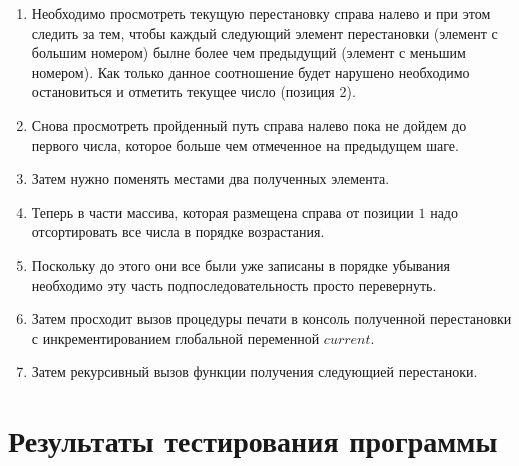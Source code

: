 \documentclass[bachelor, och, labwork]{shiza}
\begin{document}
\begin{enumerate}
    
\item Необходимо просмотреть текущую перестановку справа налево и при этом 
следить за тем, чтобы каждый следующий элемент перестановки (элемент с большим 
номером) былне более чем предыдущий (элемент с меньшим номером). Как только данное 
соотношение будет нарушено необходимо остановиться и отметить текущее число 
(позиция 2).

\item Снова просмотреть пройденный путь справа налево пока не дойдем до первого 
числа, которое больше чем отмеченное на предыдущем шаге. 

\item Затем нужно поменять местами два полученных элемента.

\item Теперь в части массива, которая размещена справа от позиции $1$ надо 
отсортировать все числа в порядке возрастания. 

\item Поскольку до этого они все были уже записаны в порядке убывания 
необходимо эту часть подпоследовательность просто перевернуть.

\item Затем просходит вызов процедуры печати в консоль полученной перестановки с
инкрементированием глобальной переменной $current$.

\item Затем рекурсивный вызов функции получения следующией перестаноки.

\end{enumerate}

\section{Результаты тестирования программы}
\end{document}
